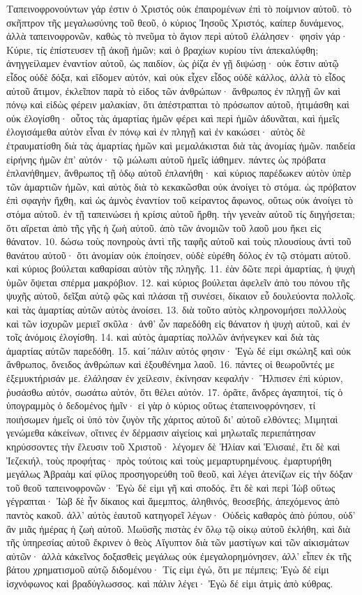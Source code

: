Ταπεινοφρονούντων γάρ ἐστιν ὁ Χριστός οὐκ ἐπαιρομένων ἐπὶ τὸ ποίμνιον αὐτοῦ. τὸ σκῆπτρον τῆς μεγαλωσύνης τοῦ θεοῦ, ὁ κύριος Ἰησοῦς Χριστός, καίπερ δυνάμενος, ἀλλὰ ταπεινοφρονῶν, καθὼς τὸ πνεῦμα τὸ ἅγιον περὶ αὐτοῦ ἐλάλησεν· φησὶν γάρ· Κύριε, τίς ἐπίστευσεν τῇ ἀκοῇ ἡμῶν; καὶ ὁ βραχίων κυρίου τίνι ἀπεκαλύφθη; ἀνηγγείλαμεν ἐναντίον αὐτοῦ, ὡς παιδίον, ὡς ῥίζα ἐν γῇ διψώσῃ· οὐκ ἔστιν αὐτῷ εἶδος οὐδὲ δόξα, καὶ εἴδομεν αὐτόν, καὶ οὐκ εἶχεν εἶδος οὐδὲ κάλλος, ἀλλὰ τὸ εἶδος αὐτοῦ ἄτιμον, ἐκλεῖπον παρὰ τὸ εἰδος τῶν ἀνθρώπων· ἄνθρωπος ἐν πληγῇ ὢν καὶ πόνῳ καὶ εἰδὼς φέρειν μαλακίαν, ὅτι ἀπέστραπται τὸ πρόσωπον αὐτοῦ, ἠτιμάσθη καὶ οὐκ ἐλογίσθη· οὗτος τὰς ἁμαρτίας ἡμῶν φέρει καὶ περὶ ἡμῶν ἀδυνᾶται, καὶ ἡμεῖς ἐλογισάμεθα αὐτὸν εἶναι ἐν πόνῳ καὶ ἐν πληγῇ καὶ ἐν κακώσει· αὐτὸς δὲ ἐτραυματίσθη διὰ τὰς ἁμαρτίας ἡμῶν καὶ μεμαλάκισται διὰ τὰς ἀνομίας ἡμῶν. παιδεία εἰρήνης ἡμῶν ἐπ’ αὐτόν· τῷ μώλωπι αὐτοῦ ἡμεῖς ἰάθημεν. πάντες ὡς πρόβατα ἐπλανήθημεν, ἄνθρωπος τῇ ὁδῳ αὐτοῦ ἐπλανήθη· καὶ κύριος παρέδωκεν αὐτὸν ὑπὲρ τῶν ἁμαρτιῶν ἡμῶν, καὶ αὐτὸς διὰ τὸ κεκακῶσθαι οὐκ ἀνοίγει τὸ στόμα. ὡς πρόβατον ἐπὶ σφαγὴν ἤχθη, καὶ ὡς ἀμνὸς ἐναντίον τοῦ κείραντος ἄφωνος, οὕτως οὐκ ἀνοίγει τὸ στόμα αὐτοῦ. ἐν τῇ ταπεινώσει ἡ κρίσις αὐτοῦ ἤρθη. τὴν γενεὰν αὐτοῦ τίς διηγήσεται; ὅτι αἴρεται ἀπὸ τῆς γῆς ἡ ζωὴ αὐτοῦ. ἀπὸ τῶν ἀνομιῶν τοῦ λαοῦ μου ἥκει εἰς θάνατον. 10. δώσω τοὺς πονηροὺς ἀντὶ τῆς ταφῆς αὐτοῦ καὶ τοὺς πλουσίους ἀντὶ τοῦ θανάτου αὐτοῦ· ὅτι ἀνομίαν οὐκ ἐποίησεν, οὐδὲ εὑρέθη δόλος ἐν τῷ στόματι αὐτοῦ. καὶ κύριος βούλεται καθαρίσαι αὐτὸν τῆς πληγῆς. 11. ἐὰν δῶτε περὶ ἁμαρτίας, ἡ ψυχὴ ὑμῶν ὄψεται σπέρμα μακρόβιον. 12. καὶ κύριος βούλεται ἀφελεῖν ἀπὸ του πόνου τῆς ψυχῆς αὐτοῦ, δεῖξαι αὐτῷ φῶς καὶ πλάσαι τῇ συνέσει, δίκαιον εὖ δουλεύοντα πολλοῖς. καὶ τὰς ἁμαρτίας αὐτῶν αὐτὸς ἀνοίσει. 13. διὰ τοῦτο αὐτὸς κληρονομήσει πολλλοὺς καὶ τῶν ἰσχυρῶν μεριεῖ σκῦλα· ἀνθ’ ὧν παρεδόθη εἰς θάνατον ἡ ψυχὴ αὐτοῦ, καὶ ἐν τοῖς ἀνόμοις ἐλογίσθη. 14. καὶ αὐτὸς ἁμαρτίας πολλῶν ἀνήνεγκεν καὶ διὰ τὰς ἁμαρτίας αὐτῶν παρεδόθη. 15. καὶ´πάλιν αὐτός φησιν· Ἐγὼ δέ εἰμι σκώληξ καὶ οὐκ ἄνθρωπος, ὄνειδος ἀνθρώπων καὶ ἐξουθένημα λαοῦ. 16. πάντες οἱ θεωροῦντές με ἐξεμυκτήρισάν με. ἐλάλησαν ἐν χείλεσιν, ἐκίνησαν κεφαλήν· Ἤλπισεν ἐπὶ κύριον, ῥυσάσθω αὐτόν, σωσάτω αὐτόν, ὅτι θέλει αὐτόν. 17. ὁρᾶτε, ἄνδρες ἀγαπητοί, τίς ὁ ὑπογραμμὸς ὁ δεδομένος ἡμῖν· εἰ γὰρ ὁ κύριος οὕτως ἐταπεινοφρόνησεν, τί ποιήσωμεν ἡμεῖς οἱ ὑπό τὸν ζυγὸν τῆς χάριτος αὐτοῦ δι’ αὐτοῦ ελθόντες;
Μιμηταὶ γενώμεθα κἀκείνων, οἵτινες ἐν δέρμασιν αἰγείοις καὶ μηλωταῖς περιεπάτησαν κηρύσσοντες τὴν ἔλευσιν τοῦ Χριστοῦ· λέγομεν δὲ Ἠλίαν καὶ Ἑλισαιέ, ἔτι δὲ καὶ Ἰεζεκιήλ, τοὺς προφήτας· πρὸς τούτοις καὶ τοὺς μεμαρτυρημένους. ἐμαρτυρήθη μεγάλως Ἀβραὰμ καί φίλος προσηγορεύθη τοῦ θεοῦ, καὶ λέγει ἀτενίζων εἰς τὴν δόξαν τοῦ θεοῦ ταπεινοφρονῶν· Ἐγὼ δέ εἰμι γῆ καὶ σποδός. ἔτι δὲ καὶ περὶ Ἰὼβ οὕτως γέγραπται· Ἰὼβ δὲ ἦν δίκαιος καὶ ἄμεμπτος, ἀληθινός, θεοσεβής, ἀπεχόμενος ἀπὸ παντὸς κακοῦ. ἀλλ’ αὐτὸς ἑαυτοῦ κατηγορεῖ λέγων· Οὐδεὶς καθαρὸς ἀπὸ ῥύπου, οὐδ’ ἂν μιᾶς ἡμέρας ἡ ζωὴ αὐτοῦ. Μωϋσῆς πιστὰς ἐν ὅλῳ τῷ οἰκῳ αὐτοῦ ἐκλήθη, καὶ διὰ τῆς ὑπηρεσίας αὑτοῦ ἔκρινεν ὁ θεὸς Αἴγυπτον διὰ τῶν μαστίγων καὶ τῶν αἰκισμάτων αὐτῶν· ἀλλὰ κἀκεῖνος δοξασθεὶς μεγάλως οὐκ ἐμεγαλορημόνησεν, ἀλλ’ εἶπεν ἐκ τῆς βάτου χρηματισμοῦ αὐτῷ διδομένου· Τίς εἰμι ἐγώ, ὅτι με πέμπεις; Ἐγὼ δέ εἰμι ἰσχνὀφωνος καὶ βραδύγλωσσος. καὶ πάλιν λέγει· Ἐγὼ δέ εἰμι ἀτμὶς ἀπὸ κύθρας. 
